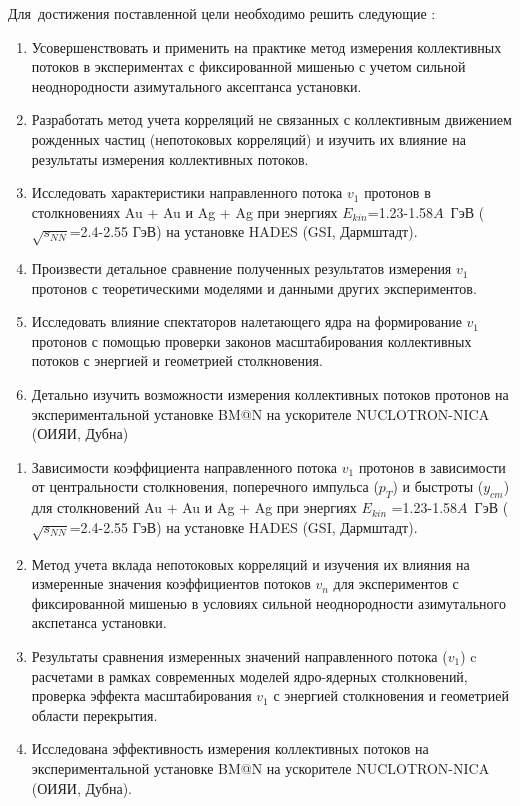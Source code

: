 Для~достижения поставленной цели необходимо решить следующие {\tasks}:
\begin{enumerate}
    \item  Усовершенствовать  и применить на практике  метод измерения коллективных потоков в экспериментах с фиксированной мишенью с учетом сильной неоднородности азимутального аксептанса установки.

    \item  Разработать метод учета корреляций не связанных с коллективным движением рожденных частиц (непотоковых корреляций) и изучить их влияние на результаты измерения коллективных потоков.

    \item  Исследовать характеристики  направленного потока $v_1$ протонов в столкновениях Au + Au и Ag + Ag при энергиях $E_{kin}$=1.23-1.58$A$~ГэВ ($\sqrt{s_{NN}}$=2.4-2.55 ГэВ) на установке HADES (GSI, Дармштадт).

    \item  Произвести детальное сравнение полученных результатов измерения $v_1$ протонов с теоретическими моделями и данными  других экспериментов.

    \item  Исследовать влияние спектаторов налетающего ядра на формирование $v_1$ протонов с помощью проверки законов масштабирования коллективных потоков с энергией и геометрией столкновения.

    \item  Детально изучить возможности измерения  коллективных потоков протонов на экспериментальной установке BM@N на ускорителе NUCLOTRON-NICA (ОИЯИ, Дубна)
\end{enumerate}

\begin{enumerate}
    \item Зависимости коэффициента направленного потока $v_1$  протонов в зависимости от центральности столкновения, поперечного импульса ($p_T$) и быстроты  ($y_{cm}$) для столкновений Au + Au и Ag + Ag при энергиях $E_{kin}$ =1.23-1.58$A$~ГэВ ($\sqrt{s_{NN}}$=2.4-2.55 ГэВ) на установке HADES (GSI, Дармштадт).
    
    \item Метод учета вклада непотоковых корреляций и изучения их влияния на измеренные значения  коэффициентов потоков $v_n$ для экспериментов с фиксированной мишенью в условиях сильной неоднородности азимутального акспетанса установки.

    \item Результаты сравнения измеренных значений направленного потока ($v_1$) c расчетами в рамках современных моделей ядро-ядерных столкновений, проверка эффекта масштабирования  $v_1$ с энергией столкновения и геометрией области перекрытия.

    \item Исследована эффективность измерения коллективных потоков на экспериментальной установке BM@N на ускорителе NUCLOTRON-NICA (ОИЯИ, Дубна).
\end{enumerate}

